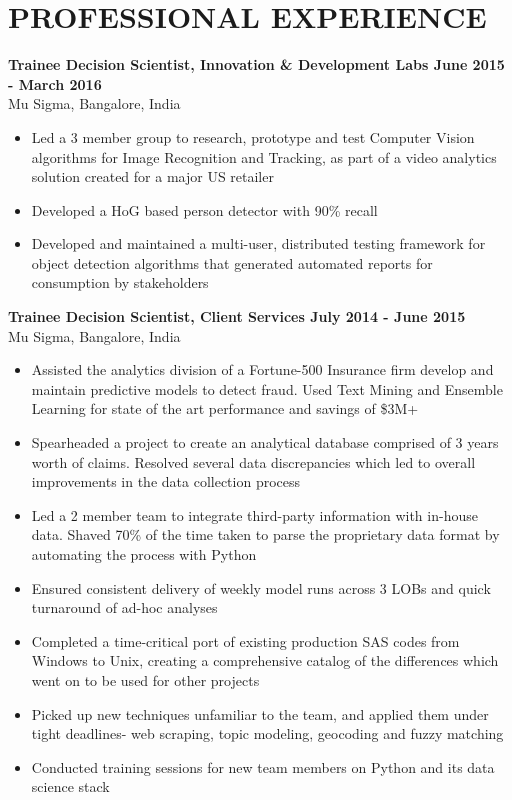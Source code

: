 \documentclass{article}
\begin{document}
\section*{PROFESSIONAL EXPERIENCE}
\noindent
\textbf{Trainee Decision Scientist, Innovation \& Development Labs \hfill June 2015 - March 2016}\\
Mu Sigma, Bangalore, India
\begin{itemize}
	\item Led a 3 member group to research, prototype and test Computer Vision
        algorithms for Image Recognition and Tracking, as part of a video analytics solution created for a major US retailer
    \item Developed a HoG based person detector with 90\% recall
	\item Developed and maintained a multi-user, distributed testing framework for object
detection algorithms that generated automated reports for consumption by stakeholders
\end{itemize}
\textbf{Trainee Decision Scientist, Client Services \hfill July 2014 - June 2015}\\
Mu Sigma, Bangalore, India
\begin{itemize}
	\item Assisted the analytics division of a Fortune-500 Insurance firm
        develop and maintain predictive models to detect fraud. Used Text
        Mining and Ensemble Learning for state of the art performance and savings of \$3M+
	\item Spearheaded a project to create an analytical database comprised of 3 years worth of claims. Resolved several data discrepancies which led to 
        overall improvements in the data collection process
    \item Led a 2 member team to integrate third-party information
        with in-house data. Shaved 70\% of the time taken to parse the
        proprietary data format by automating the process with Python
	\item Ensured consistent delivery of weekly model runs across 3 LOBs and quick turnaround of ad-hoc analyses
	\item Completed a time-critical port of existing production SAS codes from Windows to Unix, creating a
comprehensive catalog of the differences which went on to be used for other projects
	\item Picked up new techniques unfamiliar to the team, and applied them under tight deadlines- web scraping,
topic modeling, geocoding and fuzzy matching
	\item Conducted training sessions for new team members on Python and its data science stack
\end{itemize}
\end{document}
